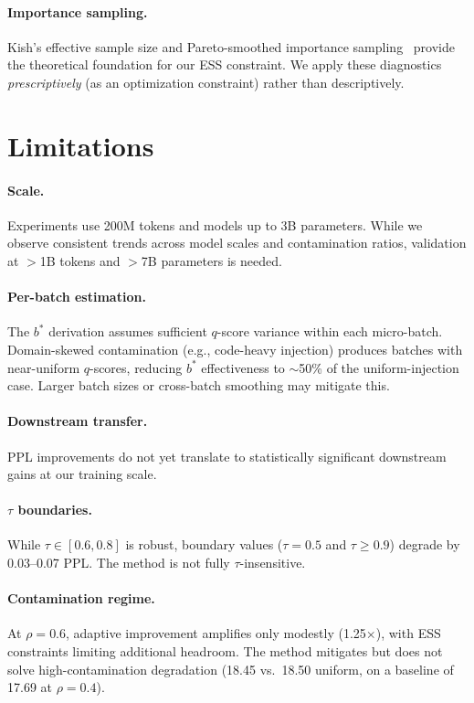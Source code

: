 \documentclass[11pt,a4paper]{article}
\newcommand{\bstar}{b^{*}}
\begin{document}
\paragraph{Importance sampling.}
Kish's effective sample size and Pareto-smoothed importance sampling~\citep{psis} provide the theoretical foundation for our ESS constraint.
We apply these diagnostics \emph{prescriptively} (as an optimization constraint) rather than descriptively.

\section{Limitations}
\label{sec:limitations}

\paragraph{Scale.}
Experiments use 200M tokens and models up to 3B parameters.
While we observe consistent trends across model scales and contamination ratios, validation at $>$1B tokens and $>$7B parameters is needed.

\paragraph{Per-batch estimation.}
The $\bstar$ derivation assumes sufficient $q$-score variance within each micro-batch.
Domain-skewed contamination (e.g., code-heavy injection) produces batches with near-uniform $q$-scores, reducing $\bstar$ effectiveness to $\sim$50\% of the uniform-injection case.
Larger batch sizes or cross-batch smoothing may mitigate this.

\paragraph{Downstream transfer.}
PPL improvements do not yet translate to statistically significant downstream gains at our training scale.

\paragraph{$\tau$ boundaries.}
While $\tau\in[0.6,0.8]$ is robust, boundary values ($\tau=0.5$ and $\tau\geq 0.9$) degrade by 0.03--0.07 PPL.
The method is not fully $\tau$-insensitive.

\paragraph{Contamination regime.}
At $\rho=0.6$, adaptive improvement amplifies only modestly (1.25$\times$), with ESS constraints limiting additional headroom.
The method mitigates but does not solve high-contamination degradation (18.45 vs.\ 18.50 uniform, on a baseline of 17.69 at $\rho=0.4$).
\end{document}
